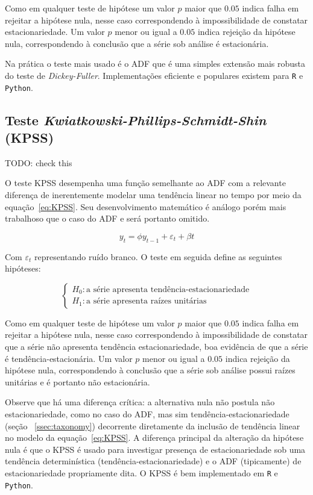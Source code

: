 Como em qualquer teste de hipótese um valor $p$ maior que $0.05$ indica falha
em rejeitar a hipótese nula, nesse caso correspondendo à impossibilidade de
constatar estacionariedade. Um valor $p$ menor ou igual a $0.05$ indica
rejeição da hipótese nula, correspondendo à conclusão que a série sob análise
é estacionária.

Na prática o teste mais usado é o ADF que é uma simples extensão mais robusta
do teste de \emph{Dickey-Fuller}. Implementações eficiente e populares existem
para \verb+R+ e \verb+Python+.

\subsection{Teste \emph{Kwiatkowski-Phillips-Schmidt-Shin} (KPSS)}

TODO: check this

O teste KPSS desempenha uma função semelhante ao ADF com a relevante
diferença de inerentemente modelar uma tendência linear no tempo por meio da
equação~\ref{eq:KPSS}. Seu desenvolvimento matemático é análogo porém mais
trabalhoso que o caso do ADF e será portanto omitido.

\begin{equation}\label{eq:KPSS}
    y_t = \phi y_{t-1} + \varepsilon_t + \beta t
\end{equation}

Com $\varepsilon_t$ representando ruído branco. O teste em seguida define as
seguintes hipóteses:

$$
\begin{cases}
    H_0: \text{a série apresenta tendência-estacionariedade} \\
    H_1: \text{a série apresenta raízes unitárias}
\end{cases}
$$

Como em qualquer teste de hipótese um valor $p$ maior que $0.05$ indica falha
em rejeitar a hipótese nula, nesse caso correspondendo à impossibilidade de
constatar que a série não apresenta tendência estacionariedade, boa evidência
de que a série é tendência-estacionária. Um valor $p$ menor ou igual a $0.05$
indica rejeição da hipótese nula, correspondendo à conclusão que a série sob
análise possui raízes unitárias e é portanto não estacionária.

Observe que há uma diferença crítica: a alternativa nula não postula não
estacionariedade, como no caso do ADF, mas sim tendência-estacionariedade
(seção ~\ref{ssec:taxonomy}) decorrente diretamente da inclusão de tendência
linear no modelo da equação~\ref{eq:KPSS}. A diferença principal da alteração
da hipótese nula é que o KPSS é usado para investigar presença de
estacionariedade sob uma tendência determinística (tendência-estacionariedade)
e o ADF (tipicamente) de estacionariedade propriamente dita. O KPSS é bem
implementado em \verb+R+ e \verb+Python+.

